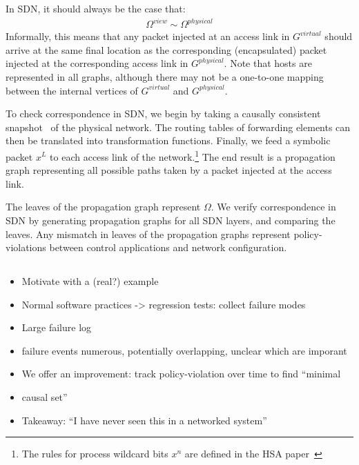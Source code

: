 In SDN, it should always be the case that:
\begin{align*}
\Omega^{view} \sim \Omega^{physical}
\end{align*}
Informally, this means that any packet injected at an access link in $G^{virtual}$ should arrive at
the same final location as the corresponding (encapsulated) packet injected at the
corresponding access link in $G^{physical}$. Note that hosts are represented
in all graphs, although there may not be a one-to-one mapping between the
internal vertices of $G^{virtual}$ and $G^{physical}$.

To check correspondence in SDN, we begin by taking a causally consistent
snapshot~\cite{Chandy:1985:DSD:214451.214456} of the physical network. The routing
tables of forwarding elements can then be translated into transformation functions.
Finally, we feed a symbolic packet $x^L$ to each access link of the
network.\footnote{The rules for process wildcard bits $x^n$ are defined in
the HSA paper~\cite{hsa}} The end result is a propagation graph representing all possible paths taken by a packet injected
at the access link.

The leaves of the propagation graph represent $\Omega$. We
verify correspondence in SDN by generating propagation graphs for all SDN layers,
and comparing the leaves. Any mismatch in leaves of the propagation graphs
represent policy-violations between control applications and network
configuration.

\subsection{\SIMULATOR{}}


\begin{itemize}
\item Motivate with a (real?) example
\item Normal software practices -> regression tests: collect failure modes
\item Large failure log
\item failure events numerous, potentially overlapping, unclear which are imporant
\item We offer an improvement: track policy-violation over time to find “minimal
\item causal set”
\item Takeaway: “I have never seen this in a networked system”
\end{itemize}

